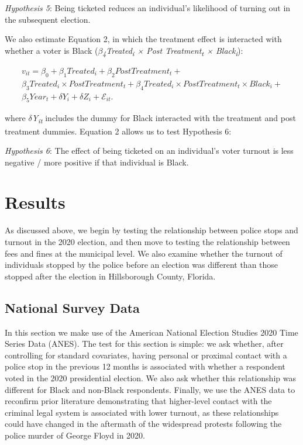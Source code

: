 \documentclass[
  12pt,
]{article}
\begin{document}
\emph{Hypothesis 5}: Being ticketed reduces an individual's likelihood of turning out in the subsequent election.

We also estimate Equation 2, in which the treatment effect is interacted with whether a voter is Black (\emph{\(\beta\)\textsubscript{4}Treated\textsubscript{i} × Post Treatment\textsubscript{t} × Black\textsubscript{i}}):

\begin{gather}
\label{eq:2}
v_{it}=\beta_0+\beta_1Treated_{i}+\beta_2Post Treatment_{t} + \nonumber \\
\beta_3Treated_{i}\times Post Treatment_{t} + \beta_4Treated_{i}\times Post Treatment_{t}\times Black_{i} +\\
\beta_5Year_{t} + \delta{Y}_{i} + \delta{Z}_{i} + \mathcal{E}_{it}. \nonumber
\end{gather}

where \emph{\(\delta\)Y\textsubscript{it}} includes the dummy for Black interacted with the treatment and post treatment dummies. Equation 2 allows us to test Hypothesis 6:

\emph{Hypothesis 6}: The effect of being ticketed on an individual's voter turnout is less negative / more positive if that individual is Black.

\hypertarget{results}{%
\section*{Results}\label{results}}

As discussed above, we begin by testing the relationship between police stops and turnout in the 2020 election, and then move to testing the relationship between fees and fines at the municipal level. We also examine whether the turnout of individuals stopped by the police before an election was different than those stopped after the election in Hillsborough County, Florida.

\hypertarget{national-survey-data-1}{%
\subsection*{National Survey Data}\label{national-survey-data-1}}

In this section we make use of the American National Election Studies 2020 Time Series Data (ANES). The test for this section is simple: we ask whether, after controlling for standard covariates, having personal or proximal contact with a police stop in the previous 12 months is associated with whether a respondent voted in the 2020 presidential election. We also ask whether this relationship was different for Black and non-Black respondents. Finally, we use the ANES data to reconfirm prior literature demonstrating that higher-level contact with the criminal legal system is associated with lower turnout, as these relationships could have changed in the aftermath of the widespread protests following the police murder of George Floyd in 2020.
\end{document}
